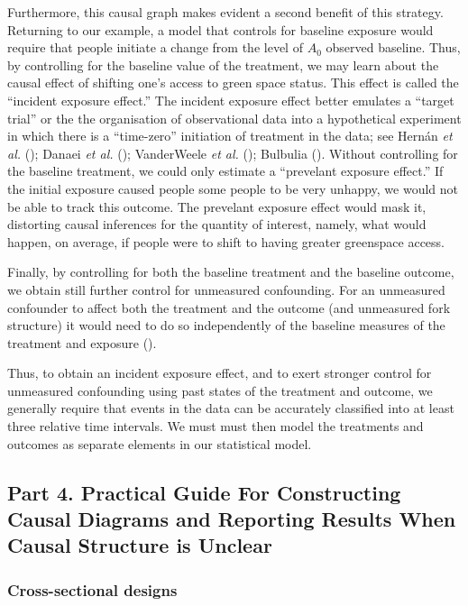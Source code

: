 \documentclass[
  singlecolumn]{article}
\begin{document}
Furthermore, this causal graph makes evident a second benefit of this
strategy. Returning to our example, a model that controls for baseline
exposure would require that people initiate a change from the level of
\(A_0\) observed baseline. Thus, by controlling for the baseline value
of the treatment, we may learn about the causal effect of shifting one's
access to green space status. This effect is called the ``incident
exposure effect.'' The incident exposure effect better emulates a
``target trial'' or the the organisation of observational data into a
hypothetical experiment in which there is a ``time-zero'' initiation of
treatment in the data; see Hernán \emph{et al.}
(); Danaei \emph{et al.}
(); VanderWeele \emph{et al.}
(); Bulbulia
(). Without controlling for the
baseline treatment, we could only estimate a ``prevelant exposure
effect.'' If the initial exposure caused people some people to be very
unhappy, we would not be able to track this outcome. The prevelant
exposure effect would mask it, distorting causal inferences for the
quantity of interest, namely, what would happen, on average, if people
were to shift to having greater greenspace access.

Finally, by controlling for both the baseline treatment and the baseline
outcome, we obtain still further control for unmeasured confounding. For
an unmeasured confounder to affect both the treatment and the outcome
(and unmeasured fork structure) it would need to do so independently of
the baseline measures of the treatment and exposure
().

Thus, to obtain an incident exposure effect, and to exert stronger
control for unmeasured confounding using past states of the treatment
and outcome, we generally require that events in the data can be
accurately classified into at least three relative time intervals. We
must must then model the treatments and outcomes as separate elements in
our statistical model.

\subsection{Part 4. Practical Guide For Constructing Causal Diagrams and
Reporting Results When Causal Structure is Unclear}\label{sec-part4}

\subsubsection{Cross-sectional designs}\label{cross-sectional-designs}
\end{document}
